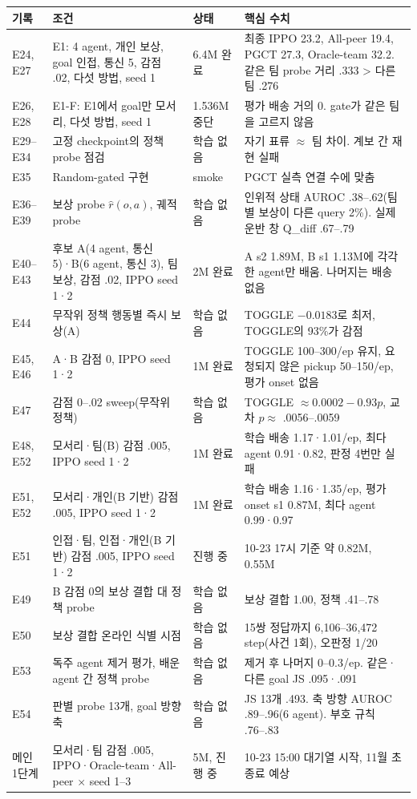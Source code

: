 \documentclass[10pt]{article}
\begin{document}
{\small
\begin{xltabular}{\textwidth}{>{\raggedright\arraybackslash}p{1.5cm} >{\raggedright\arraybackslash}p{4.4cm} >{\raggedright\arraybackslash}p{1.7cm} L}
\toprule
기록 & 조건 & 상태 & 핵심 수치 \\
\midrule
\endhead
E24, E27 & E1: 4 agent, 개인 보상, goal 인접, 통신 5, 감점 .02, 다섯 방법, seed 1 & 6.4M 완료 & 최종 IPPO 23.2, All-peer 19.4, PGCT 27.3, Oracle-team 32.2. 같은 팀 probe 거리 .333 > 다른 팀 .276 \\
E26, E28 & E1-F: E1에서 goal만 모서리, 다섯 방법, seed 1 & 1.536M 중단 & 평가 배송 거의 0. gate가 같은 팀을 고르지 않음 \\
E29--E34 & 고정 checkpoint의 정책 probe 점검 & 학습 없음 & 자기 표류 $\approx$ 팀 차이. 계보 간 재현 실패 \\
E35 & Random-gated 구현 & smoke & PGCT 실측 연결 수에 맞춤 \\
E36--E39 & 보상 probe $\hat r(o,a)$, 궤적 probe & 학습 없음 & 인위적 상태 AUROC .38--.62(팀별 보상이 다른 query 2\%). 실제 운반 창 Q\_diff .67--.79 \\
E40--E43 & 후보 A(4 agent, 통신 5)·B(6 agent, 통신 3), 팀 보상, 감점 .02, IPPO seed 1·2 & 2M 완료 & A s2 1.89M, B s1 1.13M에 각각 한 agent만 배움. 나머지는 배송 없음 \\
E44 & 무작위 정책 행동별 즉시 보상(A) & 학습 없음 & TOGGLE $-0.0183$로 최저, TOGGLE의 93\%가 감점 \\
E45, E46 & A·B 감점 0, IPPO seed 1·2 & 1M 완료 & TOGGLE 100--300/ep 유지, 요청되지 않은 pickup 50--150/ep, 평가 onset 없음 \\
E47 & 감점 0--.02 sweep(무작위 정책) & 학습 없음 & TOGGLE $\approx 0.0002 - 0.93p$, 교차 $p \approx$ .0056--.0059 \\
E48, E52 & 모서리·팀(B) 감점 .005, IPPO seed 1·2 & 1M 완료 & 학습 배송 1.17·1.01/ep, 최다 agent 0.91·0.82, 판정 4번만 실패 \\
E51, E52 & 모서리·개인(B 기반) 감점 .005, IPPO seed 1·2 & 1M 완료 & 학습 배송 1.16·1.35/ep, 평가 onset s1 0.87M, 최다 agent 0.99·0.97 \\
E51 & 인접·팀, 인접·개인(B 기반) 감점 .005, IPPO seed 1·2 & 진행 중 & 10-23 17시 기준 약 0.82M, 0.55M \\
E49 & B 감점 0의 보상 결합 대 정책 probe & 학습 없음 & 보상 결합 1.00, 정책 .41--.78 \\
E50 & 보상 결합 온라인 식별 시점 & 학습 없음 & 15쌍 정답까지 6,106--36,472 step(사건 1회), 오판정 1/20 \\
E53 & 독주 agent 제거 평가, 배운 agent 간 정책 probe & 학습 없음 & 제거 후 나머지 0--0.3/ep. 같은·다른 goal JS .095·.091 \\
E54 & 판별 probe 13개, goal 방향 축 & 학습 없음 & JS 13개 .493. 축 방향 AUROC .89--.96(6 agent). 부호 규칙 .76--.83 \\
메인 1단계 & 모서리·팀 감점 .005, IPPO·Oracle-team·All-peer $\times$ seed 1--3 & 5M, 진행 중 & 10-23 15:00 대기열 시작, 11월 초 종료 예상 \\
\bottomrule
\end{xltabular}
}
\end{document}
